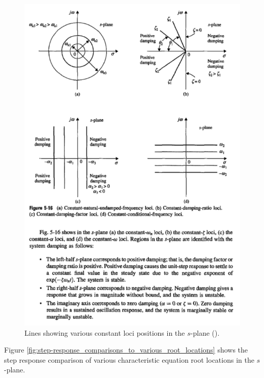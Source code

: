 \documentclass[10pt,letterpaper]{article}
\begin{document}
\begin{figure}
	\centering
	\includegraphics[width=\textwidth, height=\textheight, keepaspectratio]{constant_loci_plots.png}
	\caption{Lines showing various constant loci positions in the $s$-plane (\citet{kuo10.1}).}
	\label{fig:constant_loci_plots}
\end{figure}

Figure \ref{fig:step-response_comparisons_to_various_root_locations} shows the step response comparison of various characteristic equation root locations in the $s$-plane.
\end{document}
